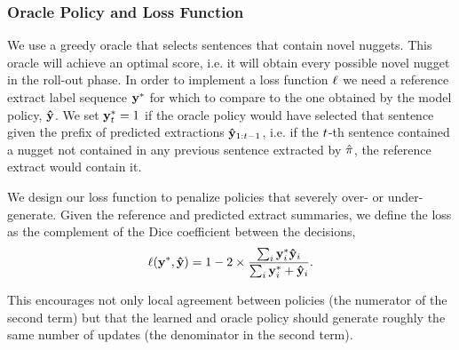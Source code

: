 \subsubsection{Oracle Policy and Loss Function}

We use a greedy oracle that selects sentences that contain novel
nuggets. This oracle will achieve an optimal \comp{} score, i.e.
it will obtain every possible novel nugget in the roll-out phase.
In order to implement a loss function $\ell$ we need a reference
extract label sequence $\mathbf{y}^*$ for which to compare to the one 
obtained by the model policy, $\mathbf{\hat{y}}$. We set 
$\mathbf{y}^*_t = 1$ if the oracle policy would have selected that
sentence given the prefix of predicted extractions $\mathbf{\hat{y}}_{1:t -1}$, i.e. if the $t$-th sentence contained a nugget not contained in
any previous sentence extracted by $\hat{\pi}$, the reference extract would
contain it.

We design our loss function to penalize policies that severely over- or
 under-generate. 
 Given the reference and predicted extract summaries, 
 we define the loss as the complement of
 the Dice coefficient between the decisions,
\begin{align*}
  \ell(\mathbf{y}^*, \mathbf{\hat{y}}) = 1 - 2 \times 
    \frac{ \sum_i \mathbf{y}^*_i \mathbf{\hat{y}}_i }{ 
    \sum_i \mathbf{y}^*_i + \mathbf{\hat{y}}_i }.
\end{align*}

 This encourages not only local agreement between policies (the numerator of
 the second term) but that the learned and oracle policy should generate
 roughly the same number of updates (the denominator in the second term).

